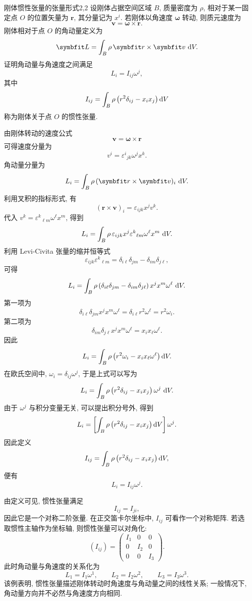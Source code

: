 \begin{example}{刚体惯性张量的张量形式}{2,2}
	设刚体占据空间区域 $B$, 质量密度为 $\rho$, 相对于某一固定点 $O$ 的位置矢量为 $\bm{r}$, 其分量记为 $x^{i}$. 若刚体以角速度 $\bm{\omega}$ 转动, 则质元速度为
	\[
	\bm{v}
	=
	\bm{\omega}\times\bm{r}.
	\]
	刚体相对于点 $O$ 的角动量定义为
	\[
	\bm{L}
	=
	\int_{B}\rho\,\bm{r}\times\bm{v}\,\dif V.
	\]
	证明角动量与角速度之间满足
	\[
	L_{i}=I_{ij}\omega^{j},
	\]
	其中
	\[
	I_{ij}
	=
	\int_{B}\rho
	\left(
	r^{2}\delta_{ij}
	-
	x_{i}x_{j}
	\right)\mathop{}\!\mathrm{d} V
	\]
	称为刚体关于点 $O$ 的惯性张量. 
	\begin{solution}
		由刚体转动的速度公式
		\[
		\bm{v}
		=
		\bm{\omega}\times\bm{r}
		\]
		可得速度分量为
		\[
		v^{i}
		=
		\varepsilon^{i}{}_{jk}\omega^{j}x^{k}.
		\]
		角动量分量为
		\[
		L_{i}
		=
		\int_{B}\rho\,(\bm{r}\times\bm{v})_{i}\,\dif V.
		\]
		利用叉积的指标形式, 有
		\[
		(\bm{r}\times\bm{v})_{i}
		=
		\varepsilon_{ijk}x^{j}v^{k}.
		\]
		代入 $v^{k}=\varepsilon^{k}{}_{\ell m}\omega^{\ell}x^{m}$, 得到
		\[
		L_{i}
		=
		\int_{B}\rho\,
		\varepsilon_{ijk}x^{j}
		\varepsilon^{k}{}_{\ell m}\omega^{\ell}x^{m}
		\,\mathop{}\!\mathrm{d} V.
		\]
		利用 Levi-Civita 张量的缩并恒等式
		\[
		\varepsilon_{ijk}\varepsilon^{k}{}_{\ell m}
		=
		\delta_{i\ell}\delta_{jm}
		-
		\delta_{im}\delta_{j\ell},
		\]
		可得
		\[
		L_{i}
		=
		\int_{B}\rho
		\left(
		\delta_{i\ell}\delta_{jm}
		-
		\delta_{im}\delta_{j\ell}
		\right)
		x^{j}x^{m}\omega^{\ell}
		\,\mathop{}\!\mathrm{d} V.
		\]
		第一项为
		\[
		\delta_{i\ell}\delta_{jm}x^{j}x^{m}\omega^{\ell}
		=
		\delta_{i\ell}r^{2}\omega^{\ell}
		=
		r^{2}\omega_{i}.
		\]
		第二项为
		\[
		\delta_{im}\delta_{j\ell}x^{j}x^{m}\omega^{\ell}
		=
		x_{i}x_{\ell}\omega^{\ell}.
		\]
		因此
		\[
		L_{i}
		=
		\int_{B}\rho
		\left(
		r^{2}\omega_{i}
		-
		x_{i}x_{\ell}\omega^{\ell}
		\right)\mathop{}\!\mathrm{d} V.
		\]
		在欧氏空间中, $\omega_{i}=\delta_{ij}\omega^{j}$, 于是上式可以写为
		\[
		L_{i}
		=
		\int_{B}\rho
		\left(
		r^{2}\delta_{ij}
		-
		x_{i}x_{j}
		\right)\omega^{j}\,\mathop{}\!\mathrm{d} V.
		\]
		由于 $\omega^{j}$ 与积分变量无关, 可以提出积分号外, 得到
		\[
		L_{i}
		=
		\left[
		\int_{B}\rho
		\left(
		r^{2}\delta_{ij}
		-
		x_{i}x_{j}
		\right)\mathop{}\!\mathrm{d} V
		\right]\omega^{j}.
		\]
		因此定义
		\[
		I_{ij}
		=
		\int_{B}\rho
		\left(
		r^{2}\delta_{ij}
		-
		x_{i}x_{j}
		\right)\mathop{}\!\mathrm{d} V,
		\]
		便有
		\[
		L_{i}
		=
		I_{ij}\omega^{j}.
		\]
		
		由定义可见, 惯性张量满足
		\[
		I_{ij}=I_{ji},
		\]
		因此它是一个对称二阶张量. 在正交笛卡尔坐标中, $I_{ij}$ 可看作一个对称矩阵. 若选取惯性主轴作为坐标轴, 则惯性张量可以对角化: 
		\[
		(I_{ij})
		=
		\begin{pmatrix}
			I_{1} & 0 & 0\\
			0 & I_{2} & 0\\
			0 & 0 & I_{3}
		\end{pmatrix}.
		\]
		此时角动量与角速度的关系化为
		\[
		L_{1}=I_{1}\omega^{1},
		\qquad
		L_{2}=I_{2}\omega^{2},
		\qquad
		L_{3}=I_{3}\omega^{3}.
		\]
		该例表明, 惯性张量描述刚体转动时角速度与角动量之间的线性关系; 一般情况下, 角动量方向并不必然与角速度方向相同. 
	\end{solution}
\end{example}

